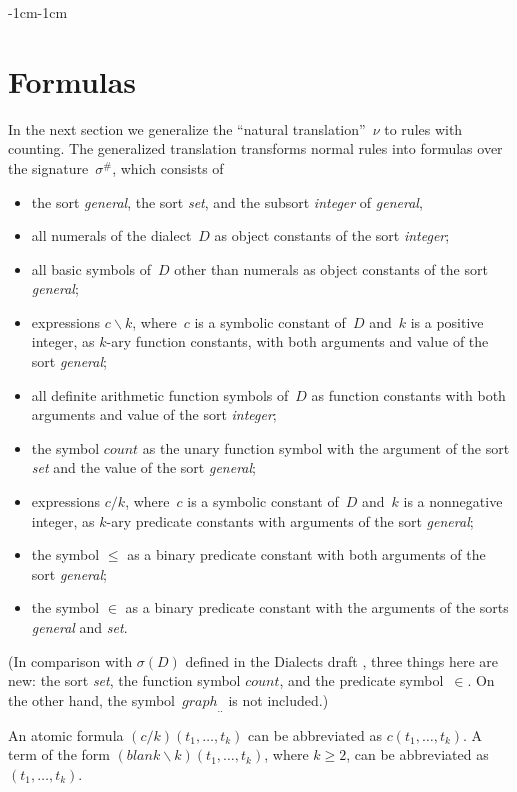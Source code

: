 \documentclass[11pt]{article}
\def\bs{\backslash}
\newcommand{\co}{\ensuremath{\mathit{count}}}
\begin{document}
\begin{adjustwidth}{-1cm}{-1cm}
\section{Formulas}

In the next section we  generalize the ``natural translation''~$\nu$
\cite{lif21,lif23,fan26b,fan26} to rules with counting. The
generalized translation transforms normal rules into formulas over
the signature~$\sigma^\#$, which consists of
\begin{itemize}
\item [(i)] the sort \emph{general}, the sort \emph{set}, and the
  subsort \emph{integer} of \emph{general},
\item [(ii)] all numerals of the dialect~$D$ as object constants of the
  sort \emph{integer};
\item [(iii)] all basic symbols of~$D$ other than numerals as object
   constants of the sort \emph{general};
 \item [(iv)] expressions $c\bs k$, where~$c$ is a symbolic constant of~$D$
   and~$k$ is a positive integer, as $k$-ary function constants, with
   both arguments and value of the sort \emph{general};
\item [(v)] all definite arithmetic
  function symbols of~$D$ as function constants with both
  arguments and value of the sort \emph{integer};
\item[(vi)] the symbol $\co$ as the unary function symbol with the argument
  of the sort \emph{set} and the value of the sort \emph{general};
\item [(vii)] expressions $c/k$, where~$c$ is a symbolic constant of~$D$
  and~$k$ is a nonnegative integer, as $k$-ary predicate constants
  with arguments of the sort \emph{general};
\item [(viii)] the symbol $\leq$ as a binary predicate constant with both
  arguments of the sort \emph{general};
\item [(ix)] the symbol $\in$ as a binary predicate constant with the
  arguments of the sorts \emph{general} and \emph{set}.
\end{itemize}
(In comparison with $\sigma(D)$ defined in the Dialects draft
\cite[Section~4.1]{fan26b}, three things here
are new: the sort \emph{set}, the function symbol $\co$, and the
predicate symbol~$\in$.  On the other hand, the
symbol~$\mathit{graph}_{..}$ is not included.)

An atomic formula $(c/k)(t_1,\dots,t_k)$ can be abbreviated
as $c(t_1,\dots,t_k)$.
A term of the form $(\mathit{blank}\bs k)(t_1,\dots,t_k)$, where $k\geq 2$,
can be abbreviated as $(t_1,\dots,t_k)$.


\end{adjustwidth}
\end{document}
